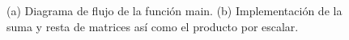 \begin{figure}[H]
\caption{(a) Diagrama de flujo de la función main. (b) Implementación de la suma y resta de matrices así como el producto por escalar.}
\label{FDp4}
\end{figure}

